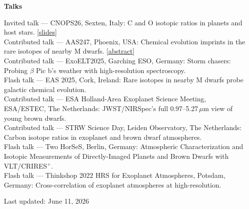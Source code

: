 \documentclass[10pt,letterpaper]{article}
\newcommand{\sectionheader}[1]{\vspace{0.55em}\noindent\textbf{#1}\vspace{0.15em}\par}
\begin{document}
\sectionheader{Talks}
\noindent Invited talk --- CNOPS26, Sexten, Italy: C and O isotopic ratios in planets and host stars. [\href{https://dgonzalezpicos.github.io}{slides}]\\
Contributed talk --- AAS247, Phoenix, USA: Chemical evolution imprints in the rare isotopes of nearby M dwarfs. [\href{https://ui.adsabs.harvard.edu/abs/2026AAS...24723101G/abstract}{abstract}]\\
Contributed talk --- ExoELT2025, Garching ESO, Germany: Storm chasers: Probing $\beta$ Pic b's weather with high-resolution spectroscopy.\\
Flash talk --- EAS 2025, Cork, Ireland: Rare isotopes in nearby M dwarfs probe galactic chemical evolution.\\
Contributed talk --- ESA Holland-Area Exoplanet Science Meeting, ESA/ESTEC, The Netherlands: JWST/NIRSpec's full 0.97--5.27\,$\mu$m view of young brown dwarfs.\\
Contributed talk --- STRW Science Day, Leiden Observatory, The Netherlands: Carbon isotope ratios in exoplanet and brown dwarf atmospheres.\\
Flash talk --- Two HorSeS, Berlin, Germany: Atmospheric Characterization and Isotopic Measurements of Directly-Imaged Planets and Brown Dwarfs with VLT/CRIRES$^{+}$.\\
Flash talk --- Thinkshop 2022 HRS for Exoplanet Atmospheres, Potsdam, Germany: Cross-correlation of exoplanet atmospheres at high-resolution.

\vfill
\begin{center}
Last updated: June 11, 2026
\end{center}
\end{document}
